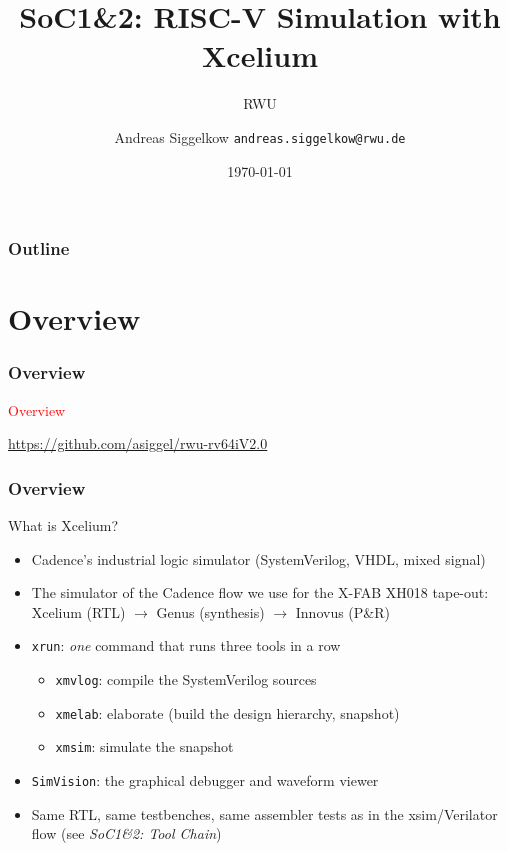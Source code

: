 \documentclass{beamer}
\title{SoC1\&2: RISC-V Simulation with Xcelium}
\author[AS]{Andreas Siggelkow \newline \texttt{andreas.siggelkow@rwu.de}}
\date[2026]{\today}
\subtitle{RWU}
\institute{Elektrotechnik und Informatik}
\newcommand{\astitle}{nix}
\newcommand{\assubtitle}{nix}
\newcommand{\cmd}[1]{\texttt{#1}}
\begin{document}
\setcounter{tocdepth}{1}

\begin{frame}
  \titlepage
\end{frame}

\begin{frame}
  \frametitle{Outline}
  \tableofcontents
\end{frame}

\section{Overview}
\renewcommand{\astitle}{Overview}
\begin{frame}
\frametitle{\astitle}
\textcolor{red}{Overview}

\url{https://github.com/asiggel/rwu-rv64iV2.0}
\end{frame}

\renewcommand{\assubtitle}{What is Xcelium?}
\begin{frame}
\frametitle{\astitle}
\begin{block}{\assubtitle}
  \begin{itemize}
    \item Cadence's industrial logic simulator (SystemVerilog, VHDL, mixed signal)
    \item The simulator of the Cadence flow we use for the X-FAB XH018 tape-out:
      Xcelium (RTL) $\rightarrow$ Genus (synthesis) $\rightarrow$ Innovus (P\&R)
    \item \cmd{xrun}: \emph{one} command that runs three tools in a row
    \begin{itemize}
      \item \cmd{xmvlog}: compile the SystemVerilog sources
      \item \cmd{xmelab}: elaborate (build the design hierarchy, snapshot)
      \item \cmd{xmsim}: simulate the snapshot
    \end{itemize}
    \item \cmd{SimVision}: the graphical debugger and waveform viewer
    \item Same RTL, same testbenches, same assembler tests as in the
      xsim/Verilator flow (see \emph{SoC1\&2: Tool Chain})
  \end{itemize}
\end{block}
\end{frame}
\end{document}
